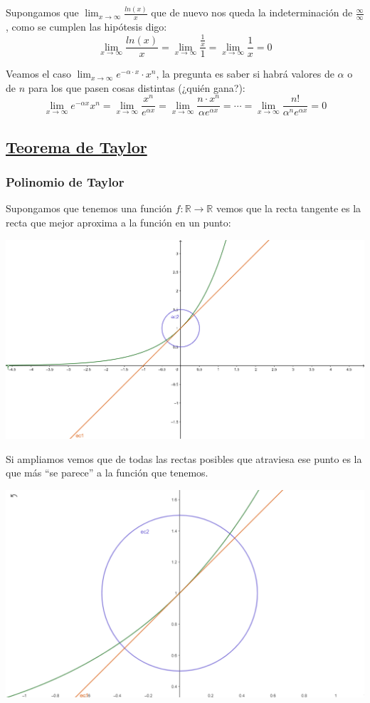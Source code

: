\documentclass[10pt,a4paper,openright]{book}
\begin{document}
Supongamos que $\lim_{x\rightarrow \infty}\frac{ln(x)}{x}$ que de nuevo nos queda la indeterminación de $\frac{\infty}{\infty}$, como se cumplen las hipótesis digo:
$$\lim_{x\rightarrow \infty} \frac{ln(x)}{x}=\lim_{x\rightarrow \infty}\frac{\frac{1}{x}}{1}=\lim_{x\rightarrow \infty}\frac{1}{x}=0$$

Veamos el caso $\lim_{x\rightarrow \infty} e^{-\alpha \cdot x}\cdot x^n$, la pregunta es saber si habrá valores de $\alpha$ o de $n$ para los que pasen cosas distintas (¿quién gana?):
$$\lim_{x\rightarrow \infty} e^{-\alpha x}x^n=\lim_{x\rightarrow \infty}\frac{x^n}{e^{\alpha x}}=\lim_{x\rightarrow \infty} \frac{n\cdot x^n}{\alpha e^{\alpha x}}=\cdots =\lim_{x\rightarrow \infty} \frac{n!}{\alpha^n e^{\alpha x}}=0$$

\subsection*{\underline{Teorema de Taylor}}
\subsubsection*{Polinomio de Taylor}
Supongamos que tenemos una función $f:\mathbb R\rightarrow \mathbb R$ vemos que la recta tangente es la recta que mejor aproxima a la función en un punto:

\begin{center}
\includegraphics[scale=0.9]{polinomio de taylor 1}
\end{center}
Si ampliamos vemos que de todas las rectas posibles que atraviesa ese punto es la que más ``se parece'' a la función que tenemos.
\begin{center}
\includegraphics[scale=0.25]{de taylor 2}
\end{center}
\end{document}
